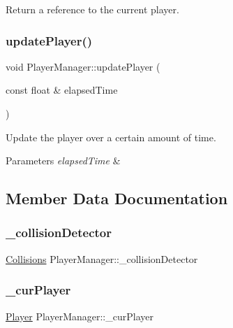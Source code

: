 Return a reference to the current player. 

\mbox{\label{class_player_manager_a171946405d72c219802315721e09467d}} 
\subsubsection{\texorpdfstring{update\+Player()}{updatePlayer()}}
{\footnotesize\ttfamily void Player\+Manager\+::update\+Player (\begin{DoxyParamCaption}\item[{const float \&}]{elapsed\+Time }\end{DoxyParamCaption})}



Update the player over a certain amount of time. 


\begin{DoxyParams}{Parameters}
{\em elapsed\+Time} & \\
\hline
\end{DoxyParams}


\subsection{Member Data Documentation}
\mbox{\label{class_player_manager_ae736dee4829cc21604a6d800b7a2222e}} 
\subsubsection{\texorpdfstring{\+\_\+collision\+Detector}{\_collisionDetector}}
{\footnotesize\ttfamily \hyperlink{class_collisions}{Collisions} Player\+Manager\+::\+\_\+collision\+Detector\hspace{0.3cm}{\ttfamily [private]}}

\mbox{\label{class_player_manager_a60256e044fc83080d90cd57d24ba0e29}} 
\subsubsection{\texorpdfstring{\+\_\+cur\+Player}{\_curPlayer}}
{\footnotesize\ttfamily \hyperlink{class_player}{Player} Player\+Manager\+::\+\_\+cur\+Player\hspace{0.3cm}{\ttfamily [private]}}

